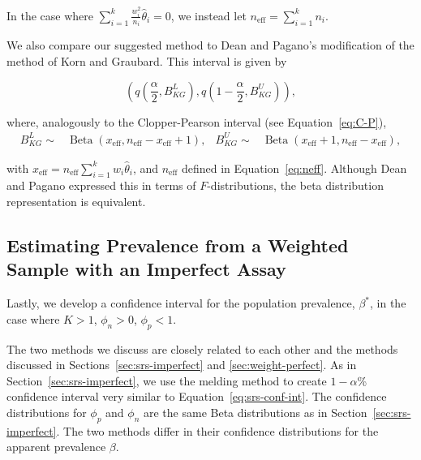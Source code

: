 In the case where \( \sum_{i=1}^k \frac{w_i^2}{n_i}\hat{\theta}_i = 0 \), we instead let \( n_{\text{eff}} = \sum_{i=1}^k n_i \).

We also compare our suggested method to Dean and Pagano's modification of the method of Korn and Graubard.\cite{Korn:1998,Dean:2015}
This interval is given by

\begin{equation}
    \left( q \left( \frac{\alpha}{2}, B^L_{KG} \right), q \left( 1 - \frac{\alpha}{2}, B^U_{KG} \right) \right),
\end{equation}

where, analogously to the Clopper-Pearson interval (see Equation~\ref{eq:C-P}),
\begin{align*}
    B^L_{KG} \sim& \operatorname{Beta}\left(x_{\text{eff}}, n_{\text{eff}} - x_{\text{eff}} + 1 \right), &
    B^U_{KG} \sim& \operatorname{Beta}\left(x_{\text{eff}} + 1, n_{\text{eff}} - x_{\text{eff}} \right),
\end{align*}

with \( x_{\text{eff}} = n_{\text{eff}} \sum_{i=1}^k w_i \hat{\theta}_i \), and \( n_{\text{eff}} \) defined in Equation~\ref{eq:neff}.
Although Dean and Pagano\cite{Dean:2015} expressed this in terms of \(F\)-distributions, the beta distribution representation is equivalent.

\subsection{Estimating Prevalence from a Weighted Sample with an Imperfect Assay}
\label{sec:weight-imperfect}

Lastly, we develop a confidence interval for the population prevalence, \( \beta^* \), in the case where \( K > 1 \), \( \phi_n > 0 \), \( \phi_p < 1 \).

The two methods we discuss are closely related to each other and the methods discussed in Sections~\ref{sec:srs-imperfect} and \ref{sec:weight-perfect}.
As in Section~\ref{sec:srs-imperfect}, we use the melding method\cite{FayP:2015} to create \( 1 - \alpha \)\% confidence interval very similar to Equation~\ref{eq:srs-conf-int}.
The confidence distributions for \( \phi_p \) and \( \phi_n \) are the same Beta distributions as in Section~\ref{sec:srs-imperfect}.
The two methods differ in their confidence distributions for the apparent prevalence \( \beta \).

